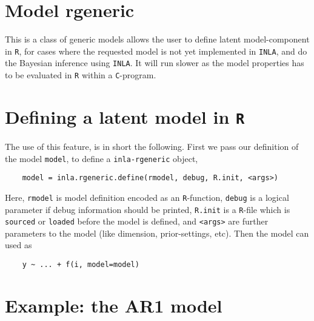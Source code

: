 \documentclass[a4paper,11pt]{article}
\begin{document}
\section*{Model \textbf{rgeneric}}

This is a class of generic models allows the user to define latent
model-component in \texttt{R}, for cases where the requested model is
not yet implemented in \texttt{INLA}, and do the Bayesian inference
using \texttt{INLA}. It will run slower as the model properties has to
be evaluated in \texttt{R} within a \texttt{C}-program.

\section*{Defining a latent model in \texttt{R}}

The use of this feature, is in short the following. First we pass our
definition of the model \texttt{model}, to define a
\texttt{inla-rgeneric} object,
{\small
\begin{verbatim}
    model = inla.rgeneric.define(rmodel, debug, R.init, <args>)
\end{verbatim}
} Here, \texttt{rmodel} is model definition encoded as an
\texttt{R}-function, \texttt{debug} is a logical parameter if debug
information should be printed, \texttt{R.init} is a \texttt{R}-file
which is \texttt{sourced} or \texttt{loaded} before the model is
defined, and \texttt{<args>} are further parameters to the model (like
dimension, prior-settings, etc).  Then the model can used as {\small
\begin{verbatim}
    y ~ ... + f(i, model=model)
\end{verbatim}
}

\section*{Example: the AR1 model}
\end{document}
